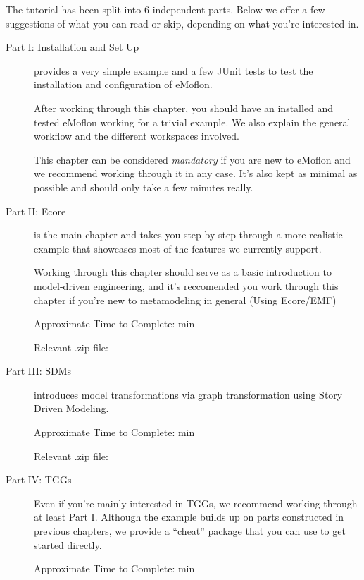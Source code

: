 The tutorial has been split into 6 independent parts. Below we offer a few suggestions of what you can read or skip, depending on what you're interested in.
 
\begin{description}

\item[Part I: Installation and Set Up]provides a very simple example and a few JUnit tests to test the installation and configuration of eMoflon.
 
After working through this chapter, you should have an installed and tested eMoflon working for a trivial example.
We also explain the general workflow and the different workspaces involved.

This chapter can be considered \emph{mandatory} if you are new to eMoflon and we recommend working through it in any case.
It's also kept as minimal as possible and should only take a few minutes really.

\item[Part II: Ecore] is the main chapter and takes you step-by-step through a more realistic example that showcases most of the features we currently support.

Working through this chapter should serve as a basic introduction to model-driven engineering, and it's reccomended you work through this chapter if you're new to metamodeling in general (Using Ecore/EMF) %

Approximate Time to Complete: min

Relevant .zip file:

\item[Part III: SDMs] introduces model transformations via graph transformation using Story Driven Modeling.

Approximate Time to Complete: min

Relevant .zip file:

\item[Part IV: TGGs] Even if you're mainly interested in TGGs, we recommend working through at least Part I. Although the example builds up on parts constructed in previous chapters, we provide a ``cheat'' package that you can use to get started directly.

Approximate Time to Complete: min


\end{description}
